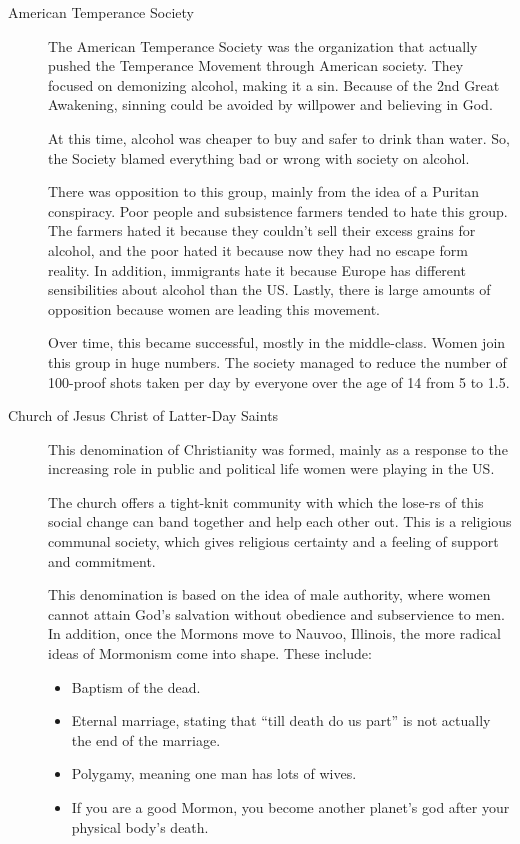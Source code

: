 \begin{description}
\item[American Temperance Society] The American Temperance Society was the organization that actually pushed the Temperance Movement through American society.
  They focused on demonizing alcohol, making it a sin.
  Because of the 2nd Great Awakening, sinning could be avoided by willpower and believing in God.

  At this time, alcohol was cheaper to buy and safer to drink than water.
  So, the Society blamed everything bad or wrong with society on alcohol.

  There was opposition to this group, mainly from the idea of a Puritan conspiracy.
  Poor people and subsistence farmers tended to hate this group.
  The farmers hated it because they couldn't sell their excess grains for alcohol, and the poor hated it because now they had no escape form reality.
  In addition, immigrants hate it because Europe has different sensibilities about alcohol than the US.\@
  Lastly, there is large amounts of opposition because women are leading this movement.

  Over time, this became successful, mostly in the middle-class.
  Women join this group in huge numbers.
  The society managed to reduce the number of 100-proof shots taken per day by everyone over the age of 14 from 5 to 1.5.

\item[Church of Jesus Christ of Latter-Day Saints] This denomination of Christianity was formed, mainly as a response to the increasing role in public and political life women were playing in the US.\@

  The church offers a tight-knit community with which the lose-rs of this social change can band together and help each other out.
  This is a religious communal society, which gives religious certainty and a feeling of support and commitment.

  This denomination is based on the idea of male authority, where women cannot attain God's salvation without obedience and subservience to men.
  In addition, once the Mormons move to Nauvoo, Illinois, the more radical ideas of Mormonism come into shape.
  These include:
  \begin{itemize}[noitemsep]
  \item Baptism of the dead.
  \item Eternal marriage, stating that ``till death do us part'' is not actually the end of the marriage.
  \item Polygamy, meaning one man has lots of wives.
  \item If you are a good Mormon, you become another planet's god after your physical body's death.
  \end{itemize}


\end{description}

